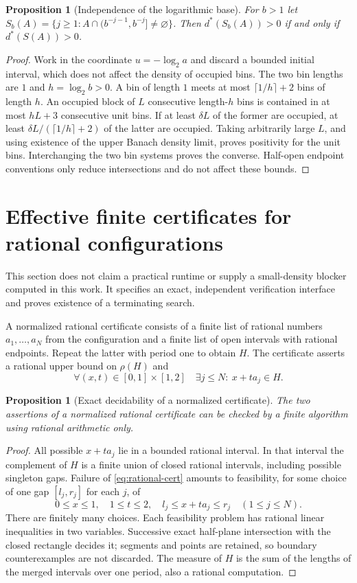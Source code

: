 \documentclass[11pt]{article}
\newtheorem{proposition}[theorem]{Proposition}
\theoremstyle{remark}\newtheorem{remark}[theorem]{Remark}
\begin{document}
\begin{proposition}[Independence of the logarithmic base]
For $b>1$ let $S_b(A)=\{j\ge1:A\cap(b^{-j-1},b^{-j}]\ne\varnothing\}$.
Then $d^*(S_b(A))>0$ if and only if $d^*(S(A))>0$.
\end{proposition}
\begin{proof}
Work in the coordinate $u=-\log_2 a$ and discard a bounded initial
interval, which does not affect the density of occupied bins. The two
bin lengths are $1$ and $h=\log_2 b>0$. A bin of length $1$ meets at
most $\lceil1/h\rceil+2$ bins of length $h$. An occupied block of $L$
consecutive length-$h$ bins is contained in at most $hL+3$
consecutive unit bins. If at least $\delta L$ of the former are
occupied, at least $\delta L/(\lceil1/h\rceil+2)$ of the latter are
occupied. Taking arbitrarily large $L$, and using existence of the
upper Banach density limit, proves positivity for the unit bins.
Interchanging the two bin systems proves the converse. Half-open
endpoint conventions only reduce intersections and do not affect these
bounds.
\end{proof}


\section{Effective finite certificates for rational configurations}
This section does not claim a practical runtime or supply a small-density
blocker computed in this work. It specifies an exact, independent
verification interface and proves existence of a terminating search.

A normalized rational certificate consists of a finite list of rational
numbers $a_1,\ldots,a_N$ from the configuration and a finite list of open
intervals with rational endpoints. Repeat the latter with period one to
obtain $H$. The certificate asserts a rational upper bound on $\rho(H)$
and
\begin{equation}\label{eq:rational-cert}
 \forall(x,t)\in[0,1]\times[1,2]\quad
 \exists j\le N:\ x+ta_j\in H.
\end{equation}

\begin{proposition}[Exact decidability of a normalized certificate]
The two assertions of a normalized rational certificate can be checked
by a finite algorithm using rational arithmetic only.
\end{proposition}
\begin{proof}
All possible $x+ta_j$ lie in a bounded rational interval. In that
interval the complement of $H$ is a finite union of closed rational
intervals, including possible singleton gaps. Failure of
\eqref{eq:rational-cert} amounts to feasibility, for some choice of one
gap $[l_j,r_j]$ for each $j$, of
\[
 0\le x\le1,\quad 1\le t\le2,\quad
 l_j\le x+ta_j\le r_j\quad(1\le j\le N).
\]
There are finitely many choices. Each feasibility problem has rational
linear inequalities in two variables. Successive exact half-plane
intersection with the closed rectangle decides it; segments and points
are retained, so boundary counterexamples are not discarded. The measure
of $H$ is the sum of the lengths of the merged intervals over one period,
also a rational computation.
\end{proof}
\end{document}
